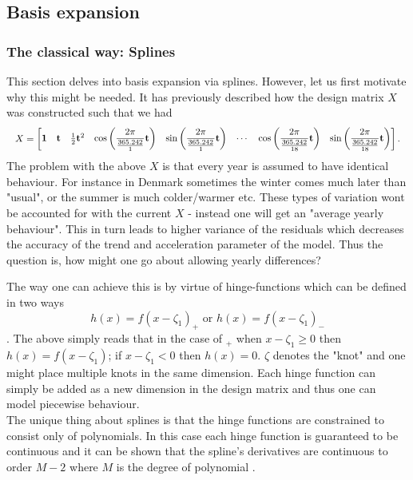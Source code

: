 \subsection{Basis expansion}
\subsubsection{The classical way: Splines}
This section delves into basis expansion via splines.
 However, let us first motivate why this might be needed.
It has previously described how the design matrix $X$ was constructed such that we had 
\begin{equation*}
\resizebox{\textwidth}{!}{$
X = \left[\begin{matrix}
	\mathbf{1} &
	\mathbf{t} &
	\frac{1}{2} \mathbf{t}^2 &
	\cos\left( \dfrac{2 \pi}{\frac{365.242}{1}} \mathbf{t} \right) &
	\sin\left( \dfrac{2 \pi}{\frac{365.242}{1}} \mathbf{t} \right) &
	\cdots &
	\cos\left( \dfrac{2 \pi}{\frac{365.242}{18}} \mathbf{t} \right) &
	\sin\left( \dfrac{2 \pi}{\frac{365.242}{18}} \mathbf{t} \right)
\end{matrix}\right].
$}
\end{equation*}
The problem with the above $X$ is that every year is assumed to have identical behaviour. 
For instance in Denmark sometimes the winter comes much later than "usual", or the summer is much colder/warmer etc. 
These types of variation wont be accounted for with the current $X$ - instead  one will get an "average yearly behaviour". 
This in turn leads to higher variance of the residuals which decreases the accuracy of the trend and acceleration parameter of the model. 
Thus the question is, how might one go about allowing yearly differences?

The way one can achieve this is by virtue of hinge-functions which can be defined in two ways
\begin{equation*}
h(x)=f(x-\zeta_1)_{+} \text{    or    } h(x)=f(x-\zeta_1)_{-}
\end{equation*}.
The above simply reads that in the case of $_{+}$ when $x-\zeta_1\ge0$  then $h(x)=f(x-\zeta_1)$; if $x-\zeta_1<0$ then $h(x)=0$.
$\zeta$ denotes the "knot" and one might place multiple knots in the same dimension. 
Each hinge function can simply be added as a new dimension in the design matrix and thus one can model piecewise behaviour.
\\
The unique thing about splines is that the hinge functions are constrained to consist only of polynomials.
 In this case each hinge function is guaranteed to be continuous and it can be shown that the spline's derivatives are continuous to order $M-2$ where $M$ is the degree of polynomial  \cite[p.~144]{statistical-learning}.


